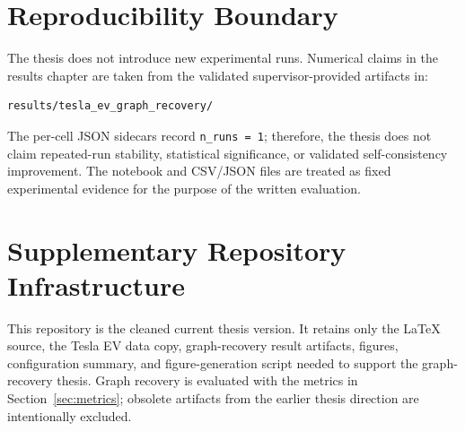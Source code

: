 \section{Reproducibility Boundary}

The thesis does not introduce new experimental runs. Numerical claims in the
results chapter are taken from the validated supervisor-provided artifacts in:

\begin{verbatim}
results/tesla_ev_graph_recovery/
\end{verbatim}

The per-cell JSON sidecars record \texttt{n\_runs = 1}; therefore, the thesis
does not claim repeated-run stability, statistical significance, or validated
self-consistency improvement. The notebook and CSV/JSON files are treated as
fixed experimental evidence for the purpose of the written evaluation.

\section{Supplementary Repository Infrastructure}

This repository is the cleaned current thesis version. It retains only the
LaTeX source, the Tesla EV data copy, graph-recovery result artifacts,
figures, configuration summary, and figure-generation script needed to support
the graph-recovery thesis. Graph recovery is evaluated with the metrics in
Section~\ref{sec:metrics}; obsolete artifacts from the earlier thesis
direction are intentionally excluded.
